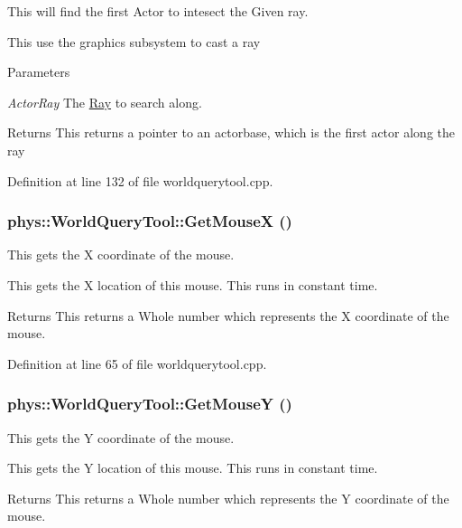 This will find the first Actor to intesect the Given ray. 

This use the graphics subsystem to cast a ray 
\begin{DoxyParams}{Parameters}
\item[{\em ActorRay}]The \hyperlink{classphys_1_1Ray}{Ray} to search along. \end{DoxyParams}
\begin{DoxyReturn}{Returns}
This returns a pointer to an actorbase, which is the first actor along the ray 
\end{DoxyReturn}


Definition at line 132 of file worldquerytool.cpp.

\hypertarget{classphys_1_1WorldQueryTool_a55721f152fb117fdfb8bc6d20af6b1dc}{
\subsubsection[{GetMouseX}]{ phys::WorldQueryTool::GetMouseX ()}}
\label{d8/d69/classphys_1_1WorldQueryTool_a55721f152fb117fdfb8bc6d20af6b1dc}


This gets the X coordinate of the mouse. 

This gets the X location of this mouse. This runs in constant time. \begin{DoxyReturn}{Returns}
This returns a Whole number which represents the X coordinate of the mouse. 
\end{DoxyReturn}


Definition at line 65 of file worldquerytool.cpp.

\hypertarget{classphys_1_1WorldQueryTool_ac2d8517db7305157c1393320f434751b}{
\subsubsection[{GetMouseY}]{ phys::WorldQueryTool::GetMouseY ()}}
\label{d8/d69/classphys_1_1WorldQueryTool_ac2d8517db7305157c1393320f434751b}


This gets the Y coordinate of the mouse. 

This gets the Y location of this mouse. This runs in constant time. \begin{DoxyReturn}{Returns}
This returns a Whole number which represents the Y coordinate of the mouse. 
\end{DoxyReturn}


